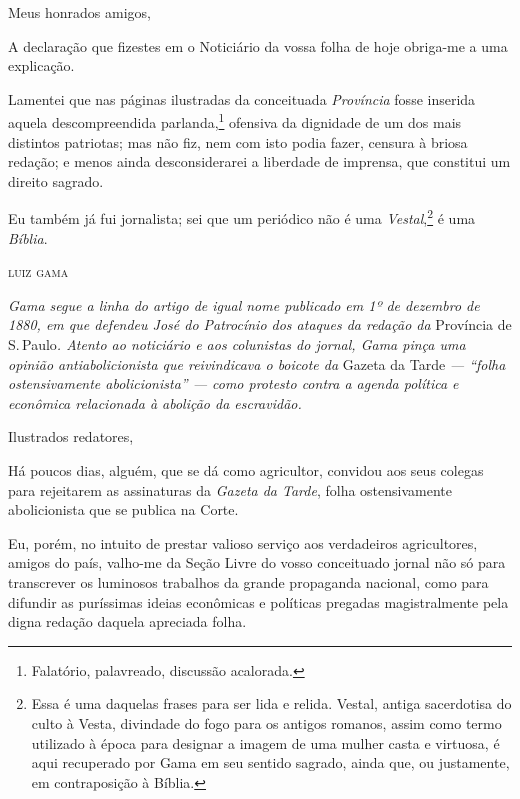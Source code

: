 Meus honrados amigos,

A declaração que fizestes em o Noticiário da vossa folha de hoje
obriga-me a uma explicação.

Lamentei que nas páginas ilustradas da conceituada \emph{Província}
fosse inserida aquela descompreendida parlanda,\footnote{Falatório,
  palavreado, discussão acalorada.} ofensiva da dignidade de um dos mais
distintos patriotas; mas não fiz, nem com isto podia fazer, censura à
briosa redação; e menos ainda desconsiderarei a liberdade de imprensa,
que constitui um direito sagrado.

Eu também já fui jornalista; sei que um periódico não é uma
\emph{Vestal},\footnote{Essa é uma daquelas frases para ser lida e relida.
  Vestal, antiga sacerdotisa do culto à Vesta, divindade do fogo para os
  antigos romanos, assim como termo utilizado à época para designar a
  imagem de uma mulher casta e virtuosa, é aqui recuperado por Gama em
  seu sentido sagrado, ainda que, ou justamente, em contraposição à
  Bíblia.} é uma \emph{Bíblia}.\medskip

\hfill\textsc{luiz gama}


\begin{resumo}
\emph{Gama segue a linha do artigo de igual nome publicado em
1º de dezembro de 1880, em que defendeu José do Patrocínio dos ataques da redação
da} Província de S.\,Paulo\emph{. Atento ao noticiário e aos colunistas
do jornal, Gama pinça uma opinião antiabolicionista que reivindicava o
boicote da} Gazeta da Tarde \emph{--- ``folha ostensivamente
abolicionista'' --- como protesto contra a agenda política e econômica
relacionada à abolição da escravidão. }
\end{resumo}

Ilustrados redatores,

Há poucos dias, alguém, que se dá como agricultor, convidou aos seus
colegas para rejeitarem as assinaturas da \emph{Gazeta da Tarde}, folha
ostensivamente abolicionista que se publica na Corte.

Eu, porém, no intuito de prestar valioso serviço aos verdadeiros
agricultores, amigos do país, valho-me da Seção Livre do vosso
conceituado jornal não só para transcrever os luminosos trabalhos da
grande propaganda nacional, como para difundir as puríssimas ideias
econômicas e políticas pregadas magistralmente pela digna redação
daquela apreciada folha.

